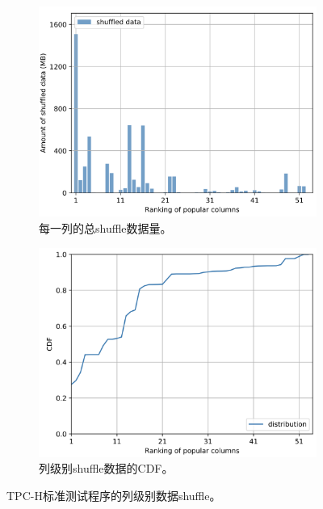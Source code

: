 \begin{figure}[htbp]
	\centering
	\begin{subfigure}[t]{0.5\textwidth}
		\centering
		\includegraphics[width=1\textwidth]{img/motivation/pop-shf-a}
		\caption{每一列的总shuffle数据量。}
		\label{fig:pop-shf-a}
	\end{subfigure}%
	\begin{subfigure}[t]{0.5\textwidth}
		\centering
		\includegraphics[width=1\textwidth]{img/motivation/pop-shf-b}
		\caption{列级别shuffle数据的CDF。}
		\label{fig:pop-shf-b}
	\end{subfigure}%
	
	\caption{TPC-H标准测试程序的列级别数据shuffle。}
	\label{fig:pop-shf}
\end{figure}



